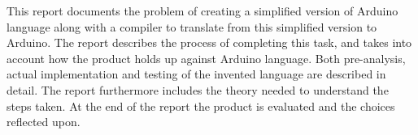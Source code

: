 This report documents the problem of creating a simplified version of Arduino language along with a compiler to translate from this simplified version to Arduino. The report describes the process of completing this task, and takes into account how the product holds up against Arduino language. Both pre-analysis, actual implementation and testing of the invented language are described in detail. The report furthermore includes the theory needed to understand the steps taken. At the end of the report the product is evaluated and the choices reflected upon.